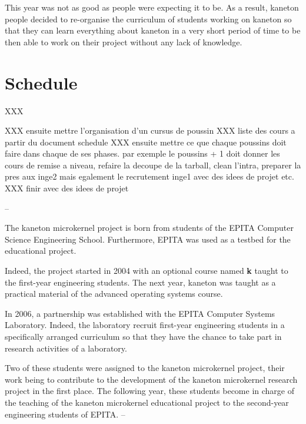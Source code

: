 \begin{multicols}{2}
This year was not as good as people were expecting it to be. As a result,
kaneton people decided to re-organise the curriculum of students working
on kaneton so that they can learn everything about kaneton in a very
short period of time to be then able to work on their project without any
lack of knowledge.

%
%

\section{Schedule}

XXX

\end{multicols}



XXX ensuite mettre l'organisation d'un cursus de poussin
XXX liste des cours a partir du document schedule
XXX ensuite mettre ce que chaque poussins doit faire dans chaque de
    ses phases. par exemple le poussins + 1 doit donner les cours de remise
    a niveau, refaire la decoupe de la tarball, clean l'intra, preparer la
    pres aux inge2 mais egalement le recrutement inge1 avec des idees de
    projet etc.
XXX finir avec des idees de projet

--


The kaneton microkernel project is born from students of the EPITA Computer
Science Engineering School. Furthermore, EPITA was used as a testbed for
the educational project.

Indeed, the project started in 2004 with an optional course named \textbf{k}
taught to the first-year engineering students. The next year, kaneton was
taught as a practical material of the advanced operating systems course.

In 2006, a partnership was established with the EPITA Computer Systems
Laboratory. Indeed, the laboratory recruit first-year engineering students
in a specifically arranged curriculum so that they have the chance to take
part in research activities of a laboratory.

Two of these students were assigned to the kaneton microkernel project, their
work being to contribute to the development of the kaneton microkernel
research project in the first place. The following year, these students
become in charge of the teaching of the kaneton microkernel educational
project to the second-year engineering students of EPITA.
--
